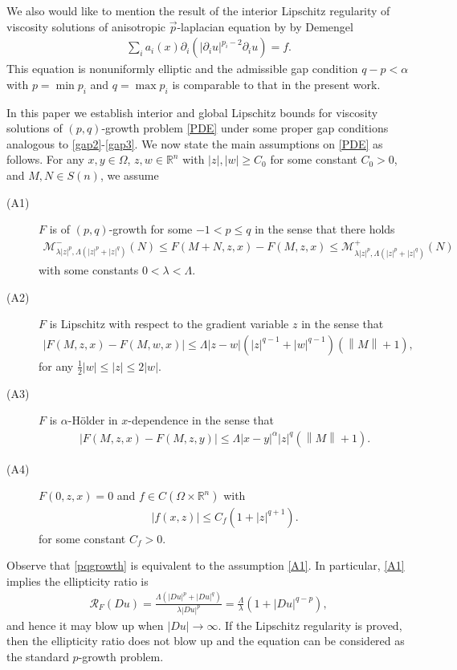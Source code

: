 \documentclass[reqno]{amsart}
\theoremstyle{plain}
\theoremstyle{definition}
\theoremstyle{remark}
\newcommand{\norm}[1]{\left\lVert#1\right\rVert}
\numberwithin{equation}{section}
\begin{document}
We also would like to mention the result of the interior Lipschitz regularity of viscosity solutions of anisotropic $\vec{p}$-laplacian equation by by Demengel \cite{Demengel17}
\begin{align*}
    \sum_{i} a_i(x)\partial_i(|\partial_iu|^{p_i-2}\partial_i u) =f.
\end{align*}
This equation is nonuniformly elliptic and the admissible gap condition $q-p<\alpha$ with $p=\min p_i$ and $q=\max p_i$ is comparable to that in the present work.


In this paper we establish interior and global Lipschitz bounds for viscosity solutions of $(p,q)$-growth problem \eqref{PDE} under some proper gap conditions analogous to \eqref{gap2}-\eqref{gap3}. We now state the main assumptions on \eqref{PDE} as follows.
For any $x,y \in \Omega$, $z,w \in \mathbb{R}^n$ with $|z|,|w| \geq C_0$ for some constant $C_0 > 0$, and $M,N \in S(n)$, we assume
\begin{description}
    \item[(A1)\label{A1}] $F$ is of $(p,q)$-growth for some $-1< p\leq q$ in the sense that there holds
    \begin{align*}
        \mathcal{M}^-_{\lambda|z|^p,\Lambda(|z|^p + |z|^q)}(N) \leq F(M+N,z,x) - F(M,z,x) \leq \mathcal{M}^+_{\lambda|z|^p,\Lambda(|z|^p + |z|^q)}(N)
    \end{align*}
    with some constants $0<\lambda< \Lambda$.
    \item[(A2)\label{A2}] $F$ is Lipschitz with respect to the gradient variable $z$ in the sense that
    \begin{align*}
    |F(M,z,x) - F(M,w,x)| \leq \Lambda|z-w|(|z|^{q-1}+|w|^{q-1})(\norm{M}+1),
    \end{align*} 
    for any $ \frac{1}{2}|w|\leq |z| \leq 2|w|$.
    \item[(A3)\label{A3}] $F$ is $\alpha$-H{\"o}lder in $x$-dependence in the sense that
    \begin{align*}
    |F(M,z,x) - F(M,z,y)| \leq \Lambda|x-y|^\alpha|z|^{q}(\norm{M}+1).
    \end{align*}
    \item[(A4)\label{A4}] $F(0,z,x) =0$ and $f \in C(\Omega \times \mathbb{R}^n)$ with
    \begin{align*}
        |f(x,z)| \leq C_f(1+|z|^{q+1}).
    \end{align*}
    for some constant $C_f > 0$.
\end{description}
Observe that \eqref{pqgrowth} is equivalent to the assumption \ref{A1}.
In particular,  \ref{A1} implies the ellipticity ratio is
\begin{align} \label{ratio}
    \mathcal{R}_F(Du) = \frac{\Lambda(|Du|^p +|Du|^q)}{\lambda|Du|^p} = \frac{\Lambda}{\lambda}(1+|Du|^{q-p}),
\end{align}
and hence it may blow up when $|Du|\to\infty$.
If the Lipschitz regularity is proved, then the ellipticity ratio does not blow up and the equation can be considered as the standard $p$-growth problem.
\end{document}
